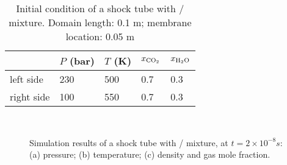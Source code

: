 \begin{table}[htbp]

    \begin{center}
        \begin{minipage}{0.8\textwidth}
            \caption{Initial condition of a shock tube with / mixture. Domain length: 0.1 m; membrane location: 0.05 m}\label{conditions}
            \begin{center}
                \begin{tabular}{@{}lllll@{}} %
                    \toprule
                               & $P$ (bar) & $T$ (K) & $x_{\rm CO_2}$ & $x_{\rm H_2O}$ \\ %
                    \midrule
                    left side  & 230       & 500     & 0.7            & 0.3            \\ %
                    right side & 100       & 550     & 0.7            & 0.3            \\ %
                    \bottomrule
                \end{tabular}
            \end{center}
        \end{minipage}
    \end{center}

\end{table}

\begin{figure}[htb]
    \centering
    \\
    \caption{Simulation results of a shock tube with / mixture, at $t=2\times10^{-8}s$: (a) pressure; (b) temperature; (c) density and gas mole fraction.}
    \label{v9}
\end{figure}

